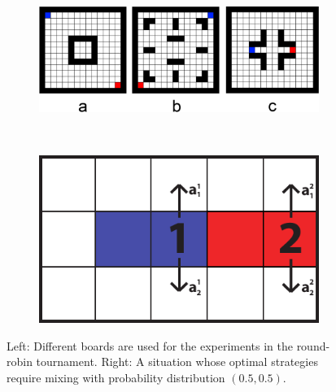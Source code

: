 \documentclass{article}
\begin{document}
\begin{figure}
\centering 
\begin{subfigure}[c]{0.5\textwidth}
\centering
\includegraphics[width=\textwidth]{images/boards.png} 
\end{subfigure}
~~~~~~~~~~~~~~
\begin{subfigure}[c]{0.29\textwidth}
\centering
\includegraphics[width=\textwidth]{images/stochastic.pdf}
\end{subfigure}
\caption{Left: Different boards are used for the experiments in the round-robin tournament. Right: A situation whose optimal strategies require mixing with probability distribution $(0.5, 0.5)$. \label{fig:boards-example}}
\end{figure}
\end{document}
